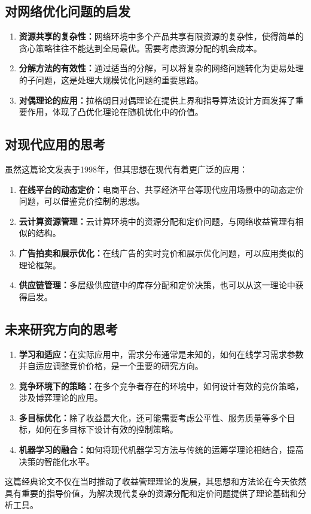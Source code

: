 \documentclass[
  10pt
]{article}
\begin{document}
\subsection{对网络优化问题的启发}

\begin{enumerate}
\item \textbf{资源共享的复杂性：}网络环境中多个产品共享有限资源的复杂性，使得简单的贪心策略往往不能达到全局最优。需要考虑资源分配的机会成本。

\item \textbf{分解方法的有效性：}通过适当的分解，可以将复杂的网络问题转化为更易处理的子问题，这是处理大规模优化问题的重要思路。

\item \textbf{对偶理论的应用：}拉格朗日对偶理论在提供上界和指导算法设计方面发挥了重要作用，体现了凸优化理论在随机优化中的价值。
\end{enumerate}

\subsection{对现代应用的思考}

虽然这篇论文发表于1998年，但其思想在现代有着更广泛的应用：

\begin{enumerate}
\item \textbf{在线平台的动态定价：}电商平台、共享经济平台等现代应用场景中的动态定价问题，可以借鉴竞价控制的思想。

\item \textbf{云计算资源管理：}云计算环境中的资源分配和定价问题，与网络收益管理有相似的结构。

\item \textbf{广告拍卖和展示优化：}在线广告的实时竞价和展示优化问题，可以应用类似的理论框架。

\item \textbf{供应链管理：}多层级供应链中的库存分配和定价决策，也可以从这一理论中获得启发。
\end{enumerate}

\subsection{未来研究方向的思考}

\begin{enumerate}
\item \textbf{学习和适应：}在实际应用中，需求分布通常是未知的，如何在线学习需求参数并自适应调整竞价价格，是一个重要的研究方向。

\item \textbf{竞争环境下的策略：}在多个竞争者存在的环境中，如何设计有效的竞价策略，涉及博弈理论的应用。

\item \textbf{多目标优化：}除了收益最大化，还可能需要考虑公平性、服务质量等多个目标，如何在多目标下设计有效的控制策略。

\item \textbf{机器学习的融合：}如何将现代机器学习方法与传统的运筹学理论相结合，提高决策的智能化水平。
\end{enumerate}

这篇经典论文不仅在当时推动了收益管理理论的发展，其思想和方法论在今天依然具有重要的指导价值，为解决现代复杂的资源分配和定价问题提供了理论基础和分析工具。
\end{document}
